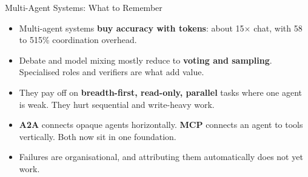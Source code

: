 \begin{frame}{Multi-Agent Systems: What to Remember}
    \begin{itemize}\itemsep0.6em
        \item Multi-agent systems \textbf{buy accuracy with tokens}: about 15$\times$ chat, with 58 to 515\% coordination overhead.
        \item Debate and model mixing mostly reduce to \textbf{voting and sampling}. Specialised roles and verifiers are what add value.
        \item They pay off on \textbf{breadth-first, read-only, parallel} tasks where one agent is weak. They hurt sequential and write-heavy work.
        \item \textbf{A2A} connects opaque agents horizontally. \textbf{MCP} connects an agent to tools vertically. Both now sit in one foundation.
        \item Failures are organisational, and attributing them automatically does not yet work.
    \end{itemize}
    \vspace{0.4em}
\end{frame}
